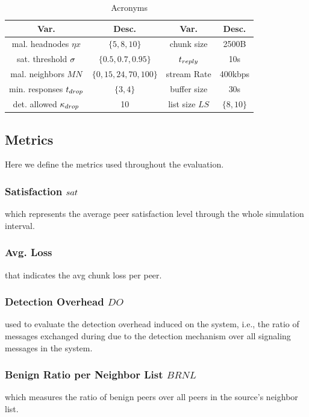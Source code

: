 \begin{table}[ht]
\center
\caption{Acronyms}
\begin{tabular}{|c|c||c|c|}
\hline

\bf{Var.} & \bf{Desc.}  & \bf{Var.} & \bf{Desc.} \\\hline\hline

mal. headnodes $\eta x$ & $\{5,8,10\}$ & chunk size & 2500B \\\hline
sat. threshold $\sigma$ & $\{0.5,0.7,0.95\}$ & $t_{reply}$ & 10s\\\hline
mal. neighbors $MN$  & $\{0,15,24,70,100\}$ & stream Rate & 400kbps\\\hline
min. responses $t_{drop}$ &  $\{3,4\}$ & buffer size & 30s  \\\hline
det. allowed $\kappa_{drop}$ & 10 & list size $LS$ & $\{8,10\}$\\\hline
  
\end{tabular}
\label{tab:parameters}
\end{table}

\subsection{Metrics}

Here we define the metrics used throughout the evaluation.
\subsubsection*{Satisfaction $sat$} which represents the average peer satisfaction level through the whole simulation interval.
\subsubsection*{Avg. Loss} that indicates the avg chunk loss per peer.
\subsubsection*{Detection Overhead $DO$} used to evaluate the detection overhead induced on the system, i.e., the ratio of messages exchanged during due to the detection mechanism over all signaling messages in the system.
\subsubsection*{Benign Ratio per Neighbor List $BRNL$} which measures the ratio of benign peers over all peers in the source's neighbor list.

